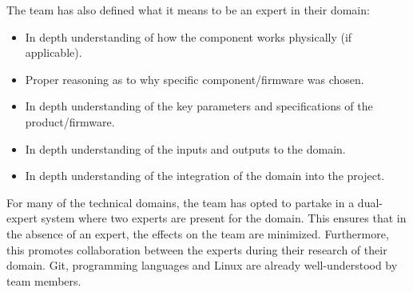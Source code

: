 \documentclass{article}
\begin{document}
The team has also defined what it means to be an expert in their domain: 
\begin{itemize}
    \item In depth understanding of how the component works physically (if applicable). 
    \item Proper reasoning as to why specific component/firmware was chosen.
    \item In depth understanding of the key parameters and specifications of the product/firmware.
    \item In depth understanding of the inputs and outputs to the domain. 
    \item In depth understanding of the integration of the domain into the project. 
\end{itemize}

For many of the technical domains, the team has opted to partake in a dual-expert system where two experts are present for the domain. This ensures that in the absence of an expert, the effects on the team are minimized. Furthermore, this promotes collaboration between the experts during their research of their domain. Git, programming languages and Linux are already well-understood by team members. 
\end{document}
